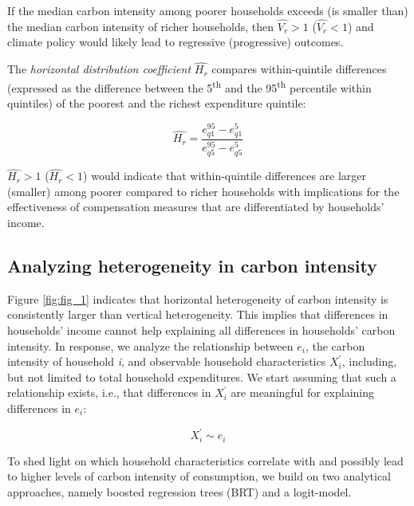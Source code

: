 \documentclass[12pt, a4paper]{article}
\begin{document}
If the median carbon intensity among poorer households exceeds (is smaller than) the median carbon intensity of richer households, then $\widehat{V_{r}}>1$ ($\widehat{V_{r}}<1$) and climate policy would likely lead to regressive (progressive) outcomes.

The \textit{horizontal distribution coefficient} $\widehat{H_{r}}$ compares within-quintile differences (expressed as the difference between the 5\textsuperscript{th} and the 95\textsuperscript{th} percentile within quintiles) of the poorest and the richest expenditure quintile:

\begin{equation}
    \widehat{H_{r}} = \frac{e_{q1}^{95} - e_{q1}^{5}}{e_{q5}^{95} - e_{q5}^{5}}
\end{equation}

$\widehat{H_{r}}>1$ ($\widehat{H_{r}}<1$) would indicate that within-quintile differences are larger (smaller) among poorer compared to richer households with implications for the effectiveness of compensation measures that are differentiated by households' income.

\subsection{Analyzing heterogeneity in carbon intensity} \label{sec:methods}

Figure \ref{fig:fig_1} indicates that horizontal heterogeneity of carbon intensity is consistently larger than vertical heterogeneity. This implies that differences in households' income cannot help explaining all differences in households' carbon intensity. In response, we analyze the relationship between $e_{i}$, the carbon intensity of household \textit{i}, and observable household characteristics $X_{i}^{'}$, including, but not limited to total household expenditures. We start assuming that such a relationship exists, i.e., that differences in $X_{i}^{'}$ are meaningful for explaining differences in $e_{i}$:

\begin{equation} \label{eq:relationship}
    X_{i}^{'} \sim e_{i} 
\end{equation}


To shed light on which household characteristics correlate with and possibly lead to higher levels of carbon intensity of consumption, we build on two analytical approaches, namely boosted regression trees (BRT) and a logit-model.
\end{document}
